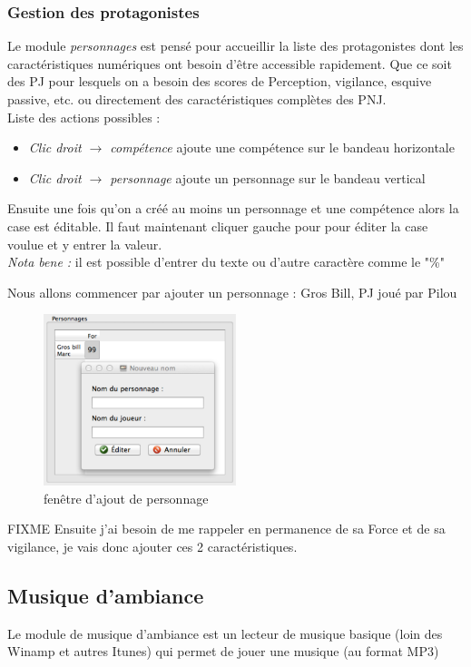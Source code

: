 \documentclass[12pt]{article}
\begin{document}
\subsubsection{Gestion des protagonistes}\label{personnage}
Le module \emph{personnages} est pensé pour accueillir la liste des protagonistes dont les caractéristiques numériques ont besoin d'être accessible rapidement. Que ce soit des PJ pour lesquels on a besoin des scores de Perception, vigilance, esquive passive, etc. ou directement des caractéristiques complètes des PNJ.
\\
Liste des actions possibles :
\begin{itemize}
    \item \emph{Clic droit $\rightarrow$ compétence} ajoute une compétence sur le bandeau horizontale
    \item \emph{Clic droit $\rightarrow$ personnage} ajoute un personnage sur le bandeau vertical 
\end{itemize}
Ensuite une fois qu'on a créé au moins un personnage et une compétence alors la case est éditable. Il faut maintenant cliquer gauche pour pour éditer la case voulue et y entrer la valeur.
\\\emph{Nota bene :} il est possible d'entrer du texte ou d'autre caractère comme le "\%"

Nous allons commencer par ajouter un personnage : Gros Bill, PJ joué par Pilou
\begin{figure}[h]
    \includegraphics[width=0.5\textwidth]{add_character}
    \caption{fenêtre d'ajout de personnage}
\end{figure}
FIXME Ensuite j'ai besoin de me rappeler en permanence de sa Force et de sa vigilance, je vais donc ajouter ces 2 caractéristiques.

\subsection{Musique d'ambiance}\label{musique}
Le module de musique d'ambiance est un lecteur de musique basique (loin des Winamp et autres Itunes) qui permet de jouer une musique (au format MP3)
\end{document}
